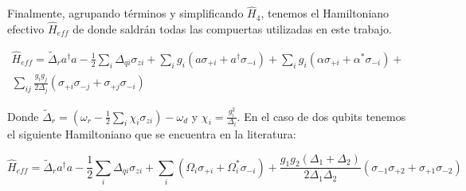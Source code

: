 Finalmente, agrupando términos y simplificando $\hat{H}_4$, tenemos el Hamiltoniano efectivo $\hat{H}_{eff}$ de donde saldrán todas las compuertas utilizadas en este trabajo.

\begin{multline}
\hat{H}_{eff} = \tilde{\Delta}_r a^\dagger a - \frac{1}{2} \sum\limits_i \Delta_{qi} \sigma_{zi} + \sum\limits_i g_i (a \sigma_{+i} + a^\dagger \sigma_{-i}) + \sum\limits_i g_i (\alpha \sigma_{+i} + \alpha^* \sigma_{-i}) + \\
\sum\limits_{ij} \frac{g_i g_j}{2 \Delta_j} \left(\sigma_{+i} \sigma_{-j} + \sigma_{+j} \sigma_{-i}\right)
\end{multline}

Donde $\tilde{\Delta}_r = (\omega_r - \frac{1}{2} \sum\limits_i \chi_i \sigma_{zi}) - \omega_d$ y $\chi_i = \frac{g_i^2}{\Delta_i}$. En el caso de dos qubits tenemos el siguiente Hamiltoniano que se encuentra en la literatura:

\begin{equation}
    \hat{H}_{eff} = \tilde{\Delta}_r a^\dagger a - \frac{1}{2} \sum\limits_i \Delta_{qi} \sigma_{zi} + \sum\limits_i (\Omega_i \sigma_{+i} + \Omega_i^* \sigma_{-i})
+ \frac{g_1 g_2 (\Delta_1 + \Delta_2)}{2 \Delta_1 \Delta_2} (\sigma_{-1} \sigma_{+2}+\sigma_{+1} \sigma_{-2})
\end{equation}







